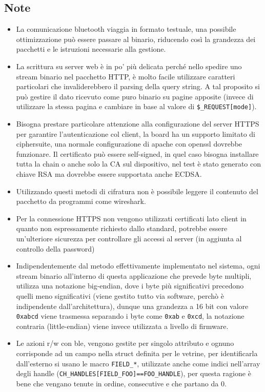\subsection{Note}
\begin{itemize}
\item La comunicazione bluetooth viaggia in formato testuale, una possibile ottimizzazione pu\`o essere passare al binario, riducendo cos\`i la grandezza dei pacchetti e le istruzioni necessarie alla gestione. 
\item La scrittura su server web \`e in po' pi\`u delicata perch\'e nello spedire uno stream binario nel pacchetto HTTP, \`e molto facile utilizzare caratteri particolari che invaliderebbero il parsing della query string. A tal proposito si pu\`o gestire il dato ricevuto come puro binario su pagine apposite (invece di utilizzare la stessa pagina e cambiare in base al valore di \texttt{\$\_REQUEST[mode]}).
\item Bisogna prestare particolare attenzione alla configurazione del server HTTPS per garantire l'autenticazione col client, la board ha un supporto limitato di ciphersuite, una normale configurazione di apache con openssl dovrebbe funzionare. Il certificato pu\`o essere self-signed, in quel caso bisogna installare tutta la chain o anche solo la CA sul dispositivo, nel test \`e stato generato con chiave RSA ma dovrebbe essere supportata anche ECDSA.
\item Utilizzando questi metodi di cifratura non \`e possibile leggere il contenuto del pacchetto da programmi come wireshark.
\item Per la connessione HTTPS non vengono utilizzati certificati lato client in quanto non espressamente richiesto dallo standard, potrebbe essere un'ulteriore sicurezza per controllare gli accessi al server (in aggiunta al controllo della password)
\item Indipendentemente dal metodo effettivamente implementato nel sistema, ogni stream binario all'interno di questa applicazione che prevede byte multipli, utilizza una notazione big-endian, dove i byte pi\`u significativi precedono quelli meno significativi (viene gestito tutto via software, perch\`o \`e indipendente dall'architettura), dunque una grandezza a 16 bit con valore \texttt{0xabcd} viene trasmessa separando i byte come \texttt{0xab} e \texttt{0xcd}, la notazione contraria (little-endian) viene invece utilizzata a livello di firmware.
\item Le azioni r/w con ble, vengono gestite per singolo attributo e ognuno corrisponde ad un campo nella struct definita per le vetrine, per identificarla dall'esterno si usano le macro \texttt{FIELD\_*}, utilizzate anche come indici nell'array degli handle (\texttt{CH\_HANDLES[FIELD\_FOO]==FOO\_HANDLE}), per questa ragione \`e bene che vengano tenute in ordine, consecutive e che partano da 0.

\end{itemize}
